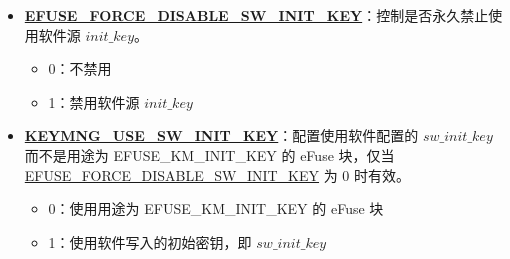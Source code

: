 \documentclass[main\_\_CN.tex]{subfiles}
\begin{document}
\begin{enumerate}
\begin{itemize}
\begin{itemize}
\begin{itemize}
                \item 0：无效
                \item 1：来自 eFuse 块，仅当 \hyperref[fielddesc:EFUSEFORCEUSEKEYMANAGERKEY]{EFUSE\_FORCE\_USE\_KEY\_MANAGER\_KEY} 中的 Bit[2] 为 0 时有效。
            \end{itemize}
            \item \textbf{Bit[3]}：配置 RSA\_DS\_KEY 是否来自 eFuse 块
            \begin{itemize}
                \item 0：无效
                \item 1：来自 eFuse 块，仅当 \hyperref[fielddesc:EFUSEFORCEUSEKEYMANAGERKEY]{EFUSE\_FORCE\_USE\_KEY\_MANAGER\_KEY} 中的 Bit[3] 为 0 时有效。
            \end{itemize}
            \item \textbf{Bit[4]}：配置 PSRAM 密钥是否来自 eFuse 块
            \begin{itemize}
                \item 0：无效
                \item 1：来自 eFuse 块，仅当 \hyperref[fielddesc:EFUSEFORCEUSEKEYMANAGERKEY]{EFUSE\_FORCE\_USE\_KEY\_MANAGER\_KEY} 中的 Bit[4] 为 0 时有效。
            \end{itemize}
        \end{itemize}
        \item \textbf{\hyperref[fielddesc:EFUSEFORCEDISABLESWINITKEY]{EFUSE\_FORCE\_DISABLE\_SW\_INIT\_KEY}}：控制是否永久禁止使用软件源 \hyperref[para:initkey]{\begin{math}init\_key\end{math}}。
        \begin{itemize}
            \item 0：不禁用
            \item 1：禁用软件源 \hyperref[para:initkey]{\begin{math}init\_key\end{math}}
        \end{itemize}
        \item \textbf{\hyperref[fielddesc:KEYMNGUSESWINITKEY]{KEYMNG\_USE\_SW\_INIT\_KEY}}：配置使用软件配置的 \begin{math}sw\_init\_key\end{math} 而不是用途为 EFUSE\_KM\_INIT\_KEY 的 eFuse 块，仅当 \hyperref[fielddesc:EFUSEFORCEDISABLESWINITKEY]{EFUSE\_FORCE\_DISABLE\_SW\_INIT\_KEY} 为 0 时有效。
        \begin{itemize}
            \item 0：使用用途为 EFUSE\_KM\_INIT\_KEY 的 eFuse 块
            \item 1：使用软件写入的初始密钥，即 \begin{math}sw\_init\_key\end{math}
        \end{itemize}


\end{itemize}
\end{enumerate}
\end{document}
